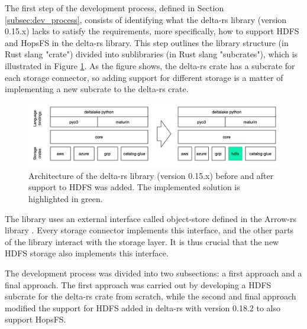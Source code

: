 
The first step of the development process, defined in Section \ref{subsec:dev_process}, consists of identifying what the delta-rs library (version 0.15.x) lacks to satisfy the requirements, more specifically, how to support \gls{HDFS} and \gls{HopsFS} in the delta-rs \cite{DeltaioDeltars2024} library. This step outlines the library structure (in Rust slang "crate") divided into sublibraries (in Rust slang "subcrates"), which is illustrated in Figure \ref{fig:delta-rs_schema}. As the figure shows, the delta-rs crate has a subcrate for each storage connector, so adding support for different storage is a matter of implementing a new subcrate to the delta-rs crate.

\begin{figure}[!ht]
    \begin{center}
      \includegraphics[width=\textwidth]{figures/4-implementation/delta-rs_schema.png}
    \caption{Architecture of the delta-rs library (version 0.15.x) before and after support to \gls{HDFS} was added. The implemented solution is highlighted in green.}
    \label{fig:delta-rs_schema}
    \end{center}
\end{figure}

The library uses an external interface called object-store defined in the Arrow-rs library \cite{ArrowrsObject_storeREADMEmd}. Every storage connector implements this interface, and the other parts of the library interact with the storage layer. It is thus crucial that the new \gls{HDFS} storage also implements this interface.

The development process was divided into two subsections: a first approach and a final approach. The first approach was carried out by developing a \gls{HDFS} subcrate for the delta-rs crate from scratch, while the second and final approach modified the support for \gls{HDFS} added in delta-rs with version 0.18.2 to also support \gls{HopsFS}.

